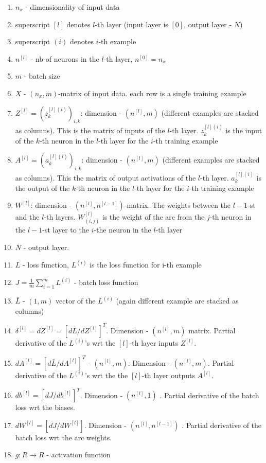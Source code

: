 \documentclass[10pt,a4paper]{article}
\begin{document}
\begin{enumerate}
	\item $n_x$ - dimensionality of input data 
	\item superscript $[l]$ denotes $l$-th layer (input layer is $[0]$, output layer - $N$)
	\item superscript $(i)$ denotes $i$-th example
	\item $n^{[l]}$ - nb of neurons in the $l$-th layer,  $n^{[0]}=n_x$
	\item $m$ - batch size 
	\item $X$ - $(n_x,m)$-matrix of input data. each row is a single training example
	\item $Z^{[l]} = (z^{[l](i)}_k)_{i,k}$: dimension - $(n^{[l]}, m)$ (different examples are stacked as columns). This  is the matrix of inputs of the $l$-th layer.  $z^{[l](i)}_k$ is the input of the $k$-th neuron in the $l$-th layer for the $i$-th training example
	\item $A^{[l]} = (a^{[l](i)}_k)_{i,k}$: dimension - $(n^{[l]}, m)$ (different examples are stacked as columns). This  the matrix of output activations of the $l$-th layer.  $a^{[l](i)}_k$ is the output of the $k$-th neuron in the $l$-th layer for the $i$-th training example
	\item $W^{[l]}$: dimension  - $(n^{[l]}, n^{[l-1]})$-matrix.  The weights between the $l-1$-st and the $l$-th layers. $W^{[l]}_{(i,j)}$ is the weight of the arc from the $j$-th neuron in the $l-1$-st layer to the $i$-the neuron in the $l$-th layer
	\item $N$ - output layer. 
	\item $L$ - loss function,  $L^{(i)}$ is the  loss function for i-th example
	\item 	$J = \frac{1}{m} \sum_{i=1}^{m} L^{(i)} $ - batch loss function 
	\item $\bar L $ - $(1, m)$ vector of the $ L^{(i)}$ (again different example are stacked as columns)
	\item $\delta^{[l]}= dZ^{[l]} = \left[ d \bar L /dZ^{[l]}  \right]^T $. Dimension - $(n^{[l]},m)$ matrix. Partial derivative of the $L^{(i)}$'s wrt  the $[l]$-th layer inputs $ Z^{[l]}$. 
	\item $ dA^{[l]} = \left[ d \bar L /dA^{[l]}  \right]^T $ - $(n^{[l]},m)$.  Dimension - $(n^{[l]},m)$. Partial derivative of the $L^{(i)}$'s wrt  the the $[l]$-th  layer outputs $ A^{[l]}$. 
	\item $ db^{[l]} = \left[ d J /db^{[l]}  \right]^T $. Dimension  - $(n^{[l]},1)$ . Partial derivative of the batch loss wrt the biases. 
	\item $ dW^{[l]} = \left[ d J /dW^{[l]}  \right] $. Dimension - $(n^{[l]},n^{[l-1]})$ . Partial derivative of the batch loss wrt the arc weights.
	\item $g:R \to R$ - activation function
\end{enumerate}
\end{document}
